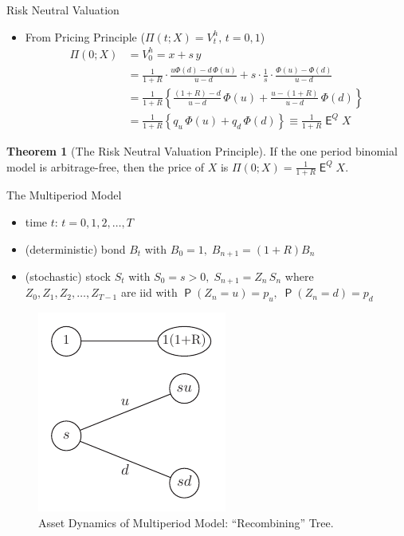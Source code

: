 \documentclass[10pt,handout]{beamer}
\newcommand{\ds}{\displaystyle}
\DeclareMathOperator\prb{\mathsf{P}}
\DeclareMathOperator\expc{\mathsf{E}}
\theoremstyle{definition}
\newtheorem*{thm}{Theorem}
\begin{document}
\begin{frame}{Risk Neutral Valuation}
  \begin{itemize}
    \item From Pricing Principle ($\Pi(t; X) = V_t^h,\, t=0,1$)
      \begin{align*}
        \Pi(0; X) &= V_0^h = x + s\,y \\
                  &= \frac{1}{1+R}\cdot\frac{u\Phi(d)-d\,\Phi(u)}{u-d} + s\cdot\frac{1}{s}\cdot\frac{\Phi(u)-\Phi(d)}{u-d} \\
                  &= \frac{1}{1+R}\left\{\frac{(1+R)-d}{u-d}\,\Phi(u) + \frac{u-(1+R)}{u-d}\,\Phi(d)\right\}\\
                  &= \frac{1}{1+R}\left\{q_u\,\Phi(u) + q_d\,\Phi(d)\right\} \equiv \frac{1}{1+R}\expc^Q X
      \end{align*}
  \end{itemize}
  \begin{thm}[The Risk Neutral Valuation Principle]
    If the one period binomial model is arbitrage-free, then the price of $X$ is $\ds\Pi(0; X) = \frac{1}{1+R}\expc^Q X$.
  \end{thm}
\end{frame}

\begin{frame}{The Multiperiod Model}
  \begin{itemize}
    \item time $t$: $t=0, 1, 2, \ldots, T$ 
    \item (deterministic) bond $B_t$ with $\ds B_0 = 1,\; B_{n+1} = (1 + R)B_n$
    \item (stochastic) stock $S_t$ with $\ds S_0 = s > 0,\; S_{n+1} = Z_n\,S_n$ where $Z_0, Z_1, Z_2,\ldots, Z_{T-1}$ are iid with $\ds\prb(Z_n=u) = p_u,\;\prb(Z_n=d) = p_d$
  \end{itemize}
  \begin{figure}[!htbp]
    \centering
    \includegraphics[scale=.75,page=3]{fig/note08/bjork.pdf}
    \vspace{-3mm}
    \caption{Asset Dynamics of Multiperiod Model: ``Recombining'' Tree.}
    \label{fig:bn3}
  \end{figure}
\end{frame}
\end{document}
